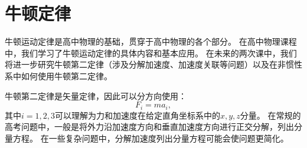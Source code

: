 

\chapter{牛顿定律}

 牛顿运动定律是高中物理的基础，贯穿于高中物理的各个部分。
 在高中物理课程中，我们学习了牛顿运动定律的具体内容和基本应用。
 在未来的两次课中，我们将进一步研究牛顿第二定律（涉及分解加速度、加速度关联等问题）以及在非惯性系中如何使用牛顿第二定律。
 
 
 
 牛顿第二定律是矢量定律，因此可以分方向使用：
 \begin{equation}
 F_i = ma_i,
 \end{equation}
 其中$ i=1,2,3 $可以理解为力和加速度在给定直角坐标系中的$ x,y,z $分量。
在常规的高考问题中，一般是将外力沿加速度方向和垂直加速度方向进行正交分解，列出分量方程。
在一些复杂问题中，分解加速度列出分量方程可能会使问题更简化。

